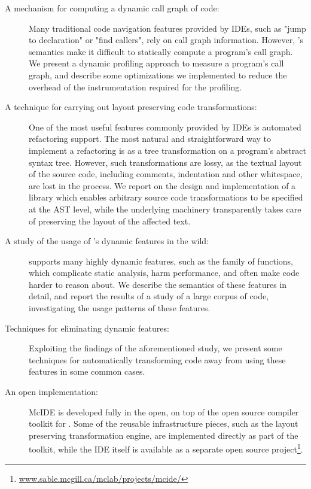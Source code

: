 \begin{description}

\item[A mechanism for computing a dynamic call graph of \matlab code:] Many
traditional code navigation features provided by IDEs, such as "jump to
declaration" or "find callers", rely on call graph information. However,
\matlab's semantics make it difficult to statically compute a program's call
graph. We present a dynamic profiling approach to measure a \matlab program's
call graph, and describe some optimizations we implemented to reduce the
overhead of the instrumentation required for the profiling.

\item[A technique for carrying out layout preserving code transformations:] One
of the most useful features commonly provided by IDEs is automated refactoring
support. The most natural and straightforward way to implement a refactoring is
as a tree transformation on a program's abstract syntax tree. However, such
transformations are lossy, as the textual layout of the source code, including
comments, indentation and other whitespace, are lost in the process. We report
on the design and implementation of a library which enables arbitrary source
code transformations to be specified at the AST level, while the underlying
machinery transparently takes care of preserving the layout of the affected
text.

\item[A study of the usage of \matlab's dynamic features in the wild:] \matlab
supports many highly dynamic features, such as the  family of
functions, which complicate static analysis, harm performance, and often make
code harder to reason about. We describe the semantics of these features in
detail, and report the results of a study of a large corpus of \matlab code,
investigating the usage patterns of these features.

\item[Techniques for eliminating dynamic features:] Exploiting the findings of
the aforementioned study, we present some techniques for automatically
transforming code away from using these features in some common cases.

\item[An open implementation:] McIDE is developed fully in the open, on top of
  the open source \mclab compiler toolkit for \matlab. Some of the reusable
  infrastructure pieces, such as the layout preserving transformation engine,
  are implemented directly as part of the toolkit, while the IDE itself is
  available as a separate open source
  project\footnote{\url{www.sable.mcgill.ca/mclab/projects/mcide/}}.

\end{description}

